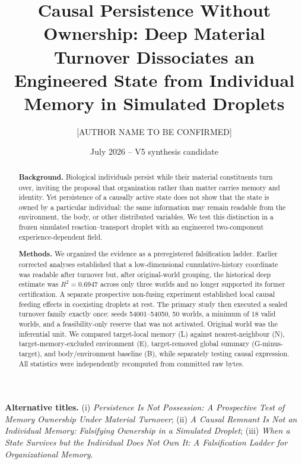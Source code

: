 \documentclass[11pt]{article}
\title{\textbf{Causal Persistence Without Ownership: Deep Material Turnover Dissociates an Engineered State from Individual Memory in Simulated Droplets}}
\author[1]{[AUTHOR NAME TO BE CONFIRMED]}
\affil[1]{[AFFILIATION AND ORCID TO BE CONFIRMED]}
\date{July 2026 -- V5 synthesis candidate}
\begin{document}
\maketitle

\begin{center}
\small\textbf{Alternative titles.} (i) \emph{Persistence Is Not Possession: A Prospective Test of Memory Ownership Under Material Turnover};
(ii) \emph{A Causal Remnant Is Not an Individual Memory: Falsifying Ownership in a Simulated Droplet};
(iii) \emph{When a State Survives but the Individual Does Not Own It: A Falsification Ladder for Organizational Memory}.
\end{center}

\begin{abstract}
\noindent\textbf{Background.}
Biological individuals persist while their material constituents turn over, inviting the proposal that organization rather than matter carries memory and identity. Yet persistence of a causally active state does not show that the state is owned by a particular individual: the same information may remain readable from the environment, the body, or other distributed variables. We test this distinction in a frozen simulated reaction--transport droplet with an engineered two-component experience-dependent field.

\noindent\textbf{Methods.}
We organized the evidence as a preregistered falsification ladder. Earlier corrected analyses established that a low-dimensional cumulative-history coordinate was readable after turnover but, after original-world grouping, the historical deep estimate was $R^2=0.6947$ across only three worlds and no longer supported its former certification. A separate prospective non-fusing experiment established local causal feeding effects in coexisting droplets at rest. The primary study then executed a sealed turnover family exactly once: seeds 54001--54050, 50 worlds, a minimum of 18 valid worlds, and a feasibility-only reserve that was not activated. Original world was the inferential unit. We compared target-local memory (L) against nearest-neighbour (N), target-memory-excluded environment (E), target-removed global summary (G-minus-target), and body/environment baseline (B), while separately testing causal expression. All statistics were independently recomputed from committed raw bytes.


\end{abstract}
\end{document}
